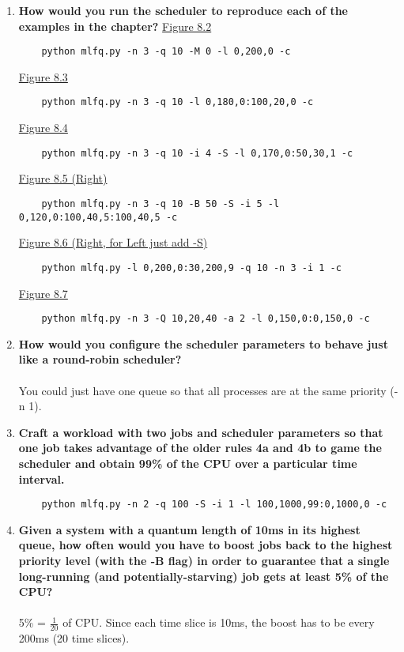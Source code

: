\documentclass{article}
\begin{document}
\begin{enumerate}
    \item \textbf{How would you run the scheduler to reproduce each of the examples in the chapter?}
    \underline{Figure 8.2}
    \begin{verbatim}
    python mlfq.py -n 3 -q 10 -M 0 -l 0,200,0 -c
    \end{verbatim}
    \underline{Figure 8.3}
    \begin{verbatim}
    python mlfq.py -n 3 -q 10 -l 0,180,0:100,20,0 -c
    \end{verbatim}
    \underline{Figure 8.4}
    \begin{verbatim}
    python mlfq.py -n 3 -q 10 -i 4 -S -l 0,170,0:50,30,1 -c
    \end{verbatim}
    \underline{Figure 8.5 (Right)}
    \begin{verbatim}
    python mlfq.py -n 3 -q 10 -B 50 -S -i 5 -l 0,120,0:100,40,5:100,40,5 -c
    \end{verbatim}
    \underline{Figure 8.6 (Right, for Left just add -S)}
    \begin{verbatim}
    python mlfq.py -l 0,200,0:30,200,9 -q 10 -n 3 -i 1 -c
    \end{verbatim}
    \underline{Figure 8.7}
    \begin{verbatim}
    python mlfq.py -n 3 -Q 10,20,40 -a 2 -l 0,150,0:0,150,0 -c
    \end{verbatim} 

    \item \textbf{How would you configure the scheduler parameters to behave just like a round-robin scheduler?}\\\\
    You could just have one queue so that all processes are at the same priority (-n 1).

    \item \textbf{Craft a workload with two jobs and scheduler parameters so that one job takes advantage of the older rules 4a and 4b to game the scheduler and obtain 99\% of the CPU over a particular time interval.}
    \begin{verbatim}
    python mlfq.py -n 2 -q 100 -S -i 1 -l 100,1000,99:0,1000,0 -c
    \end{verbatim}

    \item \textbf{Given a system with a quantum length of 10ms in its highest queue, how often would you have to boost jobs back to the highest priority level (with the -B flag) in order to guarantee that a single long-running (and potentially-starving) job gets at least 5\% of the CPU?} \\\\
    5\% = $\frac{1}{20}$ of CPU. Since each time slice is 10ms, the boost has to be every 200ms (20 time slices).


\end{enumerate}
\end{document}

